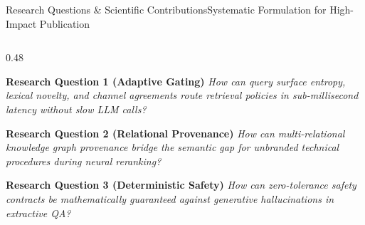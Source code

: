 \documentclass[aspectratio=169,10pt]{beamer}
\begin{document}
\begin{frame}{Research Questions \& Scientific Contributions}{Systematic Formulation for High-Impact Publication}
  \begin{columns}[T]
    \begin{column}{0.48\textwidth}
      \begin{block}{\textbf{Research Question 1 (Adaptive Gating)}}
        \scriptsize
        \textit{How can query surface entropy, lexical novelty, and channel agreements route retrieval policies in sub-millisecond latency without slow LLM calls?}
      \end{block}

      \begin{block}{\textbf{Research Question 2 (Relational Provenance)}}
        \scriptsize
        \textit{How can multi-relational knowledge graph provenance bridge the semantic gap for unbranded technical procedures during neural reranking?}
      \end{block}

      \begin{block}{\textbf{Research Question 3 (Deterministic Safety)}}
        \scriptsize
        \textit{How can zero-tolerance safety contracts be mathematically guaranteed against generative hallucinations in extractive QA?}
      \end{block}
    \end{column}


\end{columns}
\end{frame}
\end{document}
